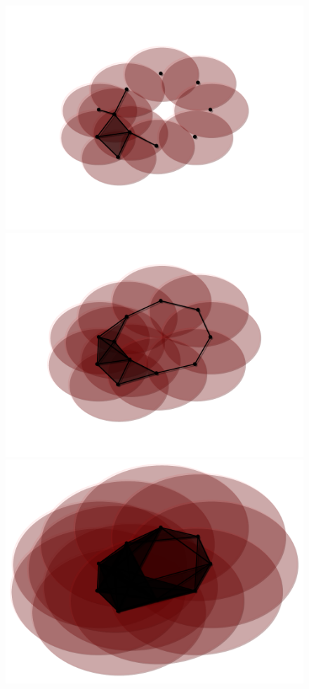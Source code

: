 \begin{figure}[htbp]
\centering
    \includegraphics[scale=0.4]{figures/persist06.pdf}
    \includegraphics[scale=0.4]{figures/persist08.pdf}
    \includegraphics[scale=0.4]{figures/persist14.pdf}

\end{figure}
